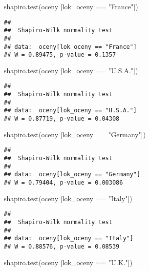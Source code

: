 \documentclass[
]{article}
\newenvironment{Shaded}{\begin{snugshade}}{\end{snugshade}}
\newcommand{\FunctionTok}[1]{\textcolor[rgb]{0.00,0.00,0.00}{#1}}
\newcommand{\NormalTok}[1]{#1}
\newcommand{\SpecialCharTok}[1]{\textcolor[rgb]{0.00,0.00,0.00}{#1}}
\newcommand{\StringTok}[1]{\textcolor[rgb]{0.31,0.60,0.02}{#1}}
\begin{document}
\begin{Shaded}
\begin{Highlighting}[]
\FunctionTok{shapiro.test}\NormalTok{(oceny [lok\_oceny }\SpecialCharTok{==} \StringTok{"France"}\NormalTok{])}
\end{Highlighting}
\end{Shaded}

\begin{verbatim}
## 
##  Shapiro-Wilk normality test
## 
## data:  oceny[lok_oceny == "France"]
## W = 0.89475, p-value = 0.1357
\end{verbatim}

\begin{Shaded}
\begin{Highlighting}[]
\FunctionTok{shapiro.test}\NormalTok{(oceny [lok\_oceny }\SpecialCharTok{==} \StringTok{"U.S.A."}\NormalTok{])}
\end{Highlighting}
\end{Shaded}

\begin{verbatim}
## 
##  Shapiro-Wilk normality test
## 
## data:  oceny[lok_oceny == "U.S.A."]
## W = 0.87719, p-value = 0.04308
\end{verbatim}

\begin{Shaded}
\begin{Highlighting}[]
\FunctionTok{shapiro.test}\NormalTok{(oceny [lok\_oceny }\SpecialCharTok{==} \StringTok{"Germany"}\NormalTok{])}
\end{Highlighting}
\end{Shaded}

\begin{verbatim}
## 
##  Shapiro-Wilk normality test
## 
## data:  oceny[lok_oceny == "Germany"]
## W = 0.79404, p-value = 0.003086
\end{verbatim}

\begin{Shaded}
\begin{Highlighting}[]
\FunctionTok{shapiro.test}\NormalTok{(oceny [lok\_oceny }\SpecialCharTok{==} \StringTok{"Italy"}\NormalTok{])}
\end{Highlighting}
\end{Shaded}

\begin{verbatim}
## 
##  Shapiro-Wilk normality test
## 
## data:  oceny[lok_oceny == "Italy"]
## W = 0.88576, p-value = 0.08539
\end{verbatim}

\begin{Shaded}
\begin{Highlighting}[]
\FunctionTok{shapiro.test}\NormalTok{(oceny [lok\_oceny }\SpecialCharTok{==} \StringTok{"U.K."}\NormalTok{])}
\end{Highlighting}
\end{Shaded}
\end{document}
